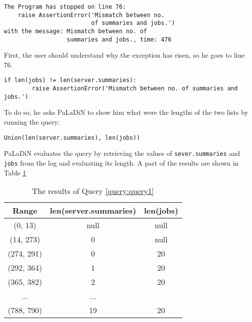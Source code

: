 \documentclass[sigconf,review]{acmart}
\begin{document}
    \begin{verbatim}
The Program has stopped on line 76:
    raise AssertionError('Mismatch between no.
                         of summaries and jobs.')
with the message: Mismatch between no. of
                  summaries and jobs., time: 476
    \end{verbatim}

    First, the user should understand why the exception has risen, so he goes to line 76.

    \begin{lstlisting}[style={python_code_short}]
    if len(jobs) != len(server.summaries):
        raise AssertionError('Mismatch between no. of summaries and jobs.')
    \end{lstlisting}

    To do so, he asks PaLaDiN to show him what were the lengths of the two lists by running the query:
    \begin{lstlisting}[style={query},label={query:query1}]
    Union(len(server.summaries), len(jobs))
    \end{lstlisting}

    PaLaDiN evaluates the query by retrieving the values of \texttt{sever.summaries}
    and \texttt{jobs} from the log and evaluating its length. A part of the results are shown in Table \ref{tab:q1res}
    \begin{table}[htbp]
        \centering
        \begin{tabular}{|c|c|c|}
            \hline
            \textbf{Range} & \textbf{len(server.summaries)} & \textbf{len(jobs)} \\
            \hline
            (0, 13)        & null                           & null               \\ \hline
            (14, 273)      & 0                              & null               \\ \hline
            (274, 291)     & 0                              & 20                 \\ \hline
            (292, 364)     & 1                              & 20                 \\ \hline
            (365, 382)     & 2                              & 20                 \\ \hline
            ...            & ...                            &                    \\ \hline
            (788, 790)     & 19                             & 20                 \\ \hline
        \end{tabular}
        \caption{The results of Query \protect\ref{query:query1}}
        \label{tab:q1res}
    \end{table}
\end{document}

